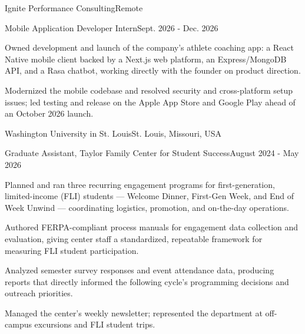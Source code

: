 \documentclass[10pt, letterpaper]{article}
\begin{document}
\begin{leadershipentry}{Ignite Performance Consulting}{Remote}
	\begin{positionentry}{Mobile Application Developer Intern}{Sept. 2026 - Dec. 2026}
		\item Owned development and launch of the company's athlete coaching app: a React Native mobile client backed by a Next.js web platform, an Express/MongoDB API, and a Rasa chatbot, working directly with the founder on product direction.
		\item Modernized the mobile codebase and resolved security and cross-platform setup issues; led testing and release on the Apple App Store and Google Play ahead of an October 2026 launch.
	\end{positionentry}
\end{leadershipentry}

\begin{leadershipentry}{Washington University in St. Louis}{St. Louis, Missouri, USA}
	\begin{positionentry}{Graduate Assistant, Taylor Family Center for Student Success}{August 2024 - May 2026}
		\item Planned and ran three recurring engagement programs for first-generation, limited-income (FLI) students — Welcome Dinner, First-Gen Week, and End of Week Unwind — coordinating logistics, promotion, and on-the-day operations.
		\item Authored FERPA-compliant process manuals for engagement data collection and evaluation, giving center staff a standardized, repeatable framework for measuring FLI student participation.
		\item Analyzed semester survey responses and event attendance data, producing reports that directly informed the following cycle's programming decisions and outreach priorities.
		\item Managed the center's weekly newsletter; represented the department at off-campus excursions and FLI student trips.
	\end{positionentry}
\end{leadershipentry}
\end{document}
